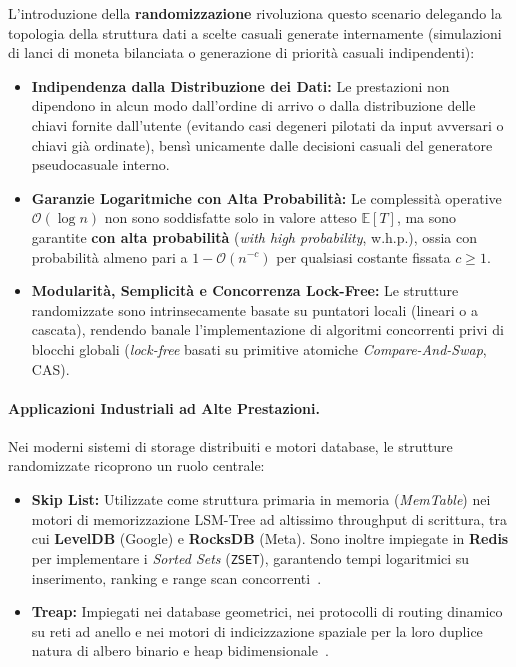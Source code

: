 L'introduzione della \textbf{randomizzazione} rivoluziona questo scenario delegando la topologia della struttura dati a scelte casuali generate internamente (simulazioni di lanci di moneta bilanciata o generazione di priorità casuali indipendenti):
\begin{itemize}
  \item \textbf{Indipendenza dalla Distribuzione dei Dati:} Le prestazioni non dipendono in alcun modo dall'ordine di arrivo o dalla distribuzione delle chiavi fornite dall'utente (evitando casi degeneri pilotati da input avversari o chiavi già ordinate), bensì unicamente dalle decisioni casuali del generatore pseudocasuale interno.
  \item \textbf{Garanzie Logaritmiche con Alta Probabilità:} Le complessità operative $\mathcal{O}(\log n)$ non sono soddisfatte solo in valore atteso $\mathbb{E}[T]$, ma sono garantite \textbf{con alta probabilità} (\textit{with high probability}, w.h.p.), ossia con probabilità almeno pari a $1 - \mathcal{O}(n^{-c})$ per qualsiasi costante fissata $c \ge 1$.
  \item \textbf{Modularità, Semplicità e Concorrenza Lock-Free:} Le strutture randomizzate sono intrinsecamente basate su puntatori locali (lineari o a cascata), rendendo banale l'implementazione di algoritmi concorrenti privi di blocchi globali (\textit{lock-free} basati su primitive atomiche \textit{Compare-And-Swap}, CAS).
\end{itemize}

\paragraph{Applicazioni Industriali ad Alte Prestazioni.}
Nei moderni sistemi di storage distribuiti e motori database, le strutture randomizzate ricoprono un ruolo centrale:
\begin{itemize}
  \item \textbf{Skip List:} Utilizzate come struttura primaria in memoria (\textit{MemTable}) nei motori di memorizzazione LSM-Tree ad altissimo throughput di scrittura, tra cui \textbf{LevelDB} (Google) e \textbf{RocksDB} (Meta). Sono inoltre impiegate in \textbf{Redis} per implementare i \textit{Sorted Sets} (\texttt{ZSET}), garantendo tempi logaritmici su inserimento, ranking e range scan concorrenti~\cite{pugh1990}.
  \item \textbf{Treap:} Impiegati nei database geometrici, nei protocolli di routing dinamico su reti ad anello e nei motori di indicizzazione spaziale per la loro duplice natura di albero binario e heap bidimensionale~\cite{seidel1996}.
\end{itemize}

